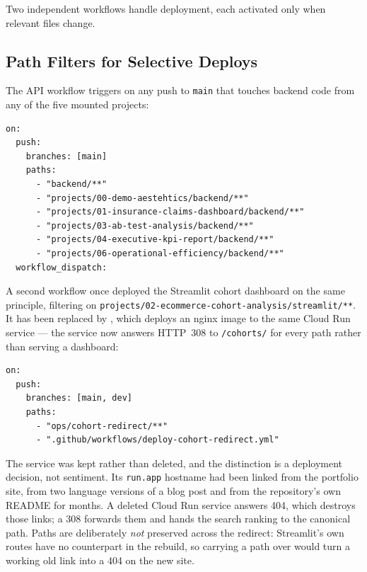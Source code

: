 
Two independent workflows handle deployment, each activated only when relevant files change.

\subsection{Path Filters for Selective Deploys}

The API workflow triggers on any push to \texttt{main} that touches backend code from any of the five mounted projects:

\begin{lstlisting}[style=yaml, caption={Path filter in deploy-api.yml}]
on:
  push:
    branches: [main]
    paths:
      - "backend/**"
      - "projects/00-demo-aestehtics/backend/**"
      - "projects/01-insurance-claims-dashboard/backend/**"
      - "projects/03-ab-test-analysis/backend/**"
      - "projects/04-executive-kpi-report/backend/**"
      - "projects/06-operational-efficiency/backend/**"
  workflow_dispatch:
\end{lstlisting}

A second workflow once deployed the Streamlit cohort dashboard on the same
principle, filtering on
\texttt{projects/02-ecommerce-cohort-analysis/streamlit/**}. It has been replaced
by , which deploys an nginx image to the
same Cloud Run service --- the service now answers HTTP~308 to
\texttt{/cohorts/} for every path rather than serving a dashboard:

\begin{lstlisting}[style=yaml, caption={Path filter in deploy-cohort-redirect.yml}]
on:
  push:
    branches: [main, dev]
    paths:
      - "ops/cohort-redirect/**"
      - ".github/workflows/deploy-cohort-redirect.yml"
\end{lstlisting}

\begin{keyinsight}
The service was kept rather than deleted, and the distinction is a deployment
decision, not sentiment. Its \texttt{run.app} hostname had been linked from the
portfolio site, from two language versions of a blog post and from the
repository's own README for months. A deleted Cloud Run service answers 404,
which destroys those links; a 308 forwards them and hands the search ranking to
the canonical path. Paths are deliberately \emph{not} preserved across the
redirect: Streamlit's own routes have no counterpart in the rebuild, so carrying
a path over would turn a working old link into a 404 on the new site.
\end{keyinsight}

